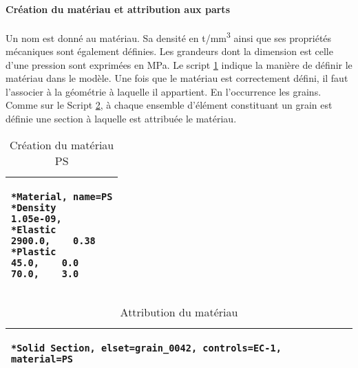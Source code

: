 \paragraph{Création du matériau et attribution aux parts\\}
Un nom est donné au matériau. Sa densité en \si[per-mode=symbol]{\tonne\per\milli\meter\cubed} ainsi que ses propriétés mécaniques sont également définies. Les grandeurs dont la dimension est celle d'une pression sont exprimées en \si{\mega\pascal}. Le script \ref{script05:def_materiau} indique la manière de définir le matériau dans le modèle. Une fois que le matériau est correctement défini, il faut l'associer à la géométrie à laquelle il appartient. En l'occurrence les grains. Comme sur le Script \ref{script05:def_materiau_bis}, à chaque ensemble d'élément constituant un grain est définie une section à laquelle est attribuée le matériau.
\begin{table}[h]\centering
	\begin{tabular}{p{}}
		\hline
		\begin{lstlisting}[language={}, breaklines=true]
*Material, name=PS
*Density
1.05e-09,
*Elastic
2900.0,    0.38
*Plastic
45.0,    0.0
70.0,    3.0
		\end{lstlisting}\\
		\hline
	\end{tabular}
	\caption{\label{script05:def_materiau}Création du matériau PS}
\end{table}
\begin{table}[h]\centering
	\begin{tabular}{p{}}
		\hline
		\begin{lstlisting}[language={}, breaklines=true]
*Solid Section, elset=grain_0042, controls=EC-1, material=PS
		\end{lstlisting}\\
		\hline
	\end{tabular}
	\caption{\label{script05:def_materiau_bis}Attribution du matériau}
\end{table}


